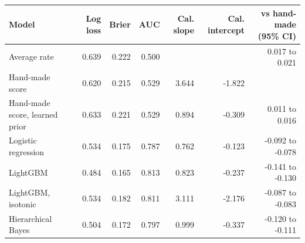 \begin{tabular}{lrrrrrr}
\toprule
Model & Log loss & Brier & AUC & Cal. slope & Cal. intercept & vs hand-made (95\% CI) \\
\midrule
Average rate & 0.639 & 0.222 & 0.500 &  &  & 0.017 to 0.021 \\
Hand-made score & 0.620 & 0.215 & 0.529 & 3.644 & -1.822 &  \\
Hand-made score, learned prior & 0.633 & 0.221 & 0.529 & 0.894 & -0.309 & 0.011 to 0.016 \\
Logistic regression & 0.534 & 0.175 & 0.787 & 0.762 & -0.123 & -0.092 to -0.078 \\
LightGBM & 0.484 & 0.165 & 0.813 & 0.823 & -0.237 & -0.141 to -0.130 \\
LightGBM, isotonic & 0.534 & 0.182 & 0.811 & 3.111 & -2.176 & -0.087 to -0.083 \\
Hierarchical Bayes & 0.504 & 0.172 & 0.797 & 0.999 & -0.337 & -0.120 to -0.111 \\
\bottomrule
\end{tabular}
